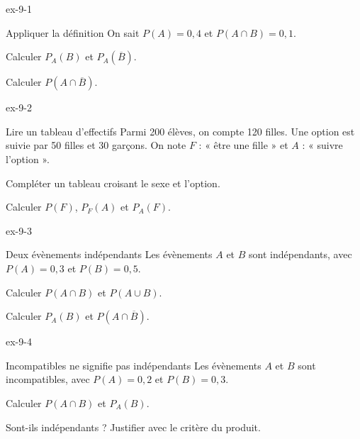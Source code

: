 \begin{blocLivre}{ex-9-1}
\begin{exercice}[1]{Appliquer la définition}
On sait $P(A)=0{,}4$ et $P(A\cap B)=0{,}1$.\begin{questions}
\item Calculer $P_A(B)$ et $P_A(\overline B)$.
\item Calculer $P(A\cap\overline B)$.
\end{questions}
\end{exercice}
\end{blocLivre}
\begin{blocLivre}{ex-9-2}
\begin{exercice}[1]{Lire un tableau d'effectifs}
Parmi 200 élèves, on compte 120 filles. Une option est suivie par 50 filles et 30 garçons. On note $F$ : « être une fille » et $A$ : « suivre l’option ».\begin{questions}
\item Compléter un tableau croisant le sexe et l’option.
\item Calculer $P(F)$, $P_F(A)$ et $P_A(F)$.
\end{questions}
\label{figlivre-r09-02-ex}

\end{exercice}
\end{blocLivre}
\begin{blocLivre}{ex-9-3}
\begin{exercice}[1]{Deux évènements indépendants}
Les évènements $A$ et $B$ sont indépendants, avec $P(A)=0{,}3$ et $P(B)=0{,}5$.\begin{questions}
\item Calculer $P(A\cap B)$ et $P(A\cup B)$.
\item Calculer $P_A(B)$ et $P(A\cap\overline B)$.
\end{questions}
\end{exercice}
\end{blocLivre}
\begin{blocLivre}{ex-9-4}
\begin{exercice}[1]{Incompatibles ne signifie pas indépendants}
Les évènements $A$ et $B$ sont incompatibles, avec $P(A)=0{,}2$ et $P(B)=0{,}3$.\begin{questions}
\item Calculer $P(A\cap B)$ et $P_A(B)$.
\item Sont-ils indépendants ? Justifier avec le critère du produit.
\end{questions}
\end{exercice}
\end{blocLivre}
